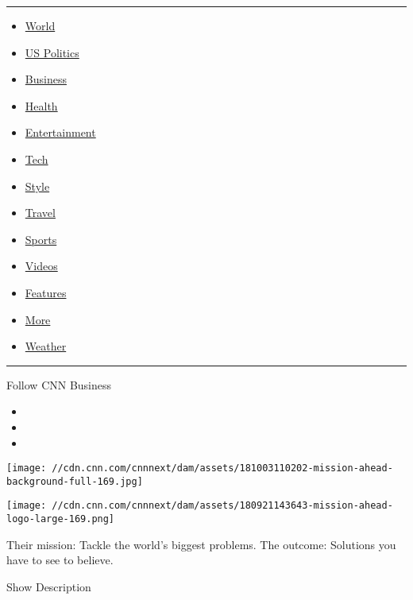\begin{center}\rule{0.5\linewidth}{\linethickness}\end{center}

\begin{itemize}
\tightlist
\item
  \href{/world}{World}
\item
  \href{/politics}{US Politics}
\item
  \href{/business}{Business}
\item
  \href{/health}{Health}
\item
  \href{/entertainment}{Entertainment}
\item
  \href{/business/tech}{Tech}
\item
  \href{/style}{Style}
\item
  \href{/travel}{Travel}
\item
  \href{/sport}{Sports}
\item
  \href{/videos}{Videos}
\item
  \href{/specials}{Features}
\item
  \href{/more}{More}
\item
  \href{/weather}{Weather}
\end{itemize}

\begin{center}\rule{0.5\linewidth}{\linethickness}\end{center}

Follow CNN Business

\begin{itemize}
\item
\item
\item
\end{itemize}

\texttt{[image: //cdn.cnn.com/cnnnext/dam/assets/181003110202-mission-ahead-background-full-169.jpg]}

\texttt{[image: //cdn.cnn.com/cnnnext/dam/assets/180921143643-mission-ahead-logo-large-169.png]}

Their mission: Tackle the world's biggest problems. The outcome:
Solutions you have to see to believe.

Show Description


